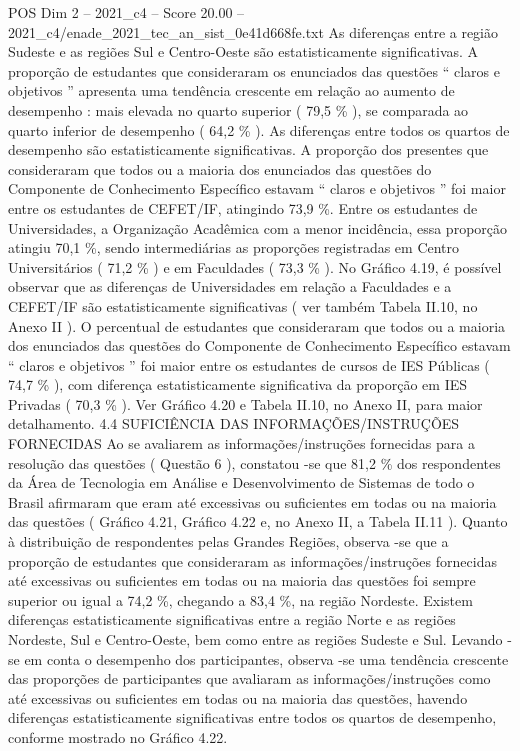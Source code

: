 \begin{textsample}{POS Dim 2 – 2021\_c4 – Score 20.00 – 2021\_c4/enade\_2021\_tec\_an\_sist\_0e41d668fe.txt}
As diferenças entre a região Sudeste e as regiões Sul e Centro-Oeste são estatisticamente significativas.
A proporção de estudantes que consideraram os enunciados das questões “ claros e objetivos ” apresenta uma tendência crescente em relação ao aumento de desempenho : mais elevada no quarto superior ( 79,5 \% ), se comparada ao quarto inferior de desempenho ( 64,2 \% ).
As diferenças entre todos os quartos de desempenho são estatisticamente significativas.
A proporção dos presentes que consideraram que todos ou a maioria dos enunciados das questões do Componente de Conhecimento Específico estavam “ claros e objetivos ” foi maior entre os estudantes de CEFET/IF, atingindo 73,9 \%.
Entre os estudantes de Universidades, a Organização Acadêmica com a menor incidência, essa proporção atingiu 70,1 \%, sendo intermediárias as proporções registradas em Centro Universitários ( 71,2 \% ) e em Faculdades ( 73,3 \% ).
No Gráfico 4.19, é possível observar que as diferenças de Universidades em relação a Faculdades e a CEFET/IF são estatisticamente significativas ( ver também Tabela II.10, no Anexo II ).
O percentual de estudantes que consideraram que todos ou a maioria dos enunciados das questões do Componente de Conhecimento Específico estavam “ claros e objetivos ” foi maior entre os estudantes de cursos de IES Públicas ( 74,7 \% ), com diferença estatisticamente significativa da proporção em IES Privadas ( 70,3 \% ).
Ver Gráfico 4.20 e Tabela II.10, no Anexo II, para maior detalhamento. 4.4 SUFICIÊNCIA DAS INFORMAÇÕES/INSTRUÇÕES FORNECIDAS Ao se avaliarem as informações/instruções fornecidas para a resolução das questões ( Questão 6 ), constatou -se que 81,2 \% dos respondentes da Área de Tecnologia em Análise e Desenvolvimento de Sistemas de todo o Brasil afirmaram que eram até excessivas ou suficientes em todas ou na maioria das questões ( Gráfico 4.21, Gráfico 4.22 e, no Anexo II, a Tabela II.11 ).
Quanto à distribuição de respondentes pelas Grandes Regiões, observa -se que a proporção de estudantes que consideraram as informações/instruções fornecidas até excessivas ou suficientes em todas ou na maioria das questões foi sempre superior ou igual a 74,2 \%, chegando a 83,4 \%, na região Nordeste.
Existem diferenças estatisticamente significativas entre a região Norte e as regiões Nordeste, Sul e Centro-Oeste, bem como entre as regiões Sudeste e Sul.
Levando -se em conta o desempenho dos participantes, observa -se uma tendência crescente das proporções de participantes que avaliaram as informações/instruções como até excessivas ou suficientes em todas ou na maioria das questões, havendo diferenças estatisticamente significativas entre todos os quartos de desempenho, conforme mostrado no Gráfico 4.22.

\end{textsample}
